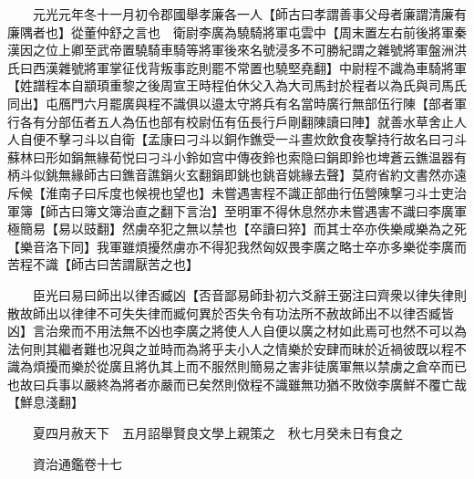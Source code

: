 　　元光元年冬十一月初令郡國舉孝廉各一人【師古曰孝謂善事父母者廉謂清廉有廉隅者也】從董仲舒之言也　衛尉李廣為驍騎將軍屯雲中【周末置左右前後將軍秦漢因之位上卿至武帝置驍騎車騎等將軍後來名號浸多不可勝紀謂之雜號將軍盤洲洪氏曰西漢雜號將軍掌征伐背叛事訖則罷不常置也驍堅堯翻】中尉程不識為車騎將軍【姓譜程本自顓頊重黎之後周宣王時程伯休父入為大司馬封於程者以為氏與司馬氏同出】屯鴈門六月罷廣與程不識俱以邉太守將兵有名當時廣行無部伍行陳【部者軍行各有分部伍者五人為伍也部有校尉伍有伍長行戶剛翻陳讀曰陣】就善水草舍止人人自便不擊刁斗以自衛【孟康曰刁斗以銅作鐎受一斗晝炊飲食夜撃持行故名曰刁斗蘇林曰形如鋗無緣荀悦曰刁斗小鈴如宫中傳夜鈴也索隐曰鋗即鈴也埤蒼云鐎温器有柄斗似銚無緣師古曰鐎音譙鋗火玄翻鋗即銚也銚音姚緣去聲】莫府省約文書然亦遠斥候【淮南子曰斥度也候視也望也】未嘗遇害程不識正部曲行伍營陳撃刁斗士吏治軍簿【師古曰簿文簿治直之翻下言治】至明軍不得休息然亦未嘗遇害不識曰李廣軍極簡易【易以豉翻】然虜卒犯之無以禁也【卒讀曰猝】而其士卒亦佚樂咸樂為之死【樂音洛下同】我軍雖煩擾然虜亦不得犯我然匈奴畏李廣之略士卒亦多樂從李廣而苦程不識【師古曰苦謂厭苦之也】

　　臣光曰易曰師出以律否臧凶【否音鄙易師卦初六爻辭王弼注曰齊衆以律失律則散故師出以律律不可失失律而臧何異於否失令有功法所不赦故師出不以律否臧皆凶】言治衆而不用法無不凶也李廣之將使人人自便以廣之材如此焉可也然不可以為法何則其繼者難也况與之並時而為將乎夫小人之情樂於安肆而昧於近禍彼既以程不識為煩擾而樂於從廣且將仇其上而不服然則簡易之害非徒廣軍無以禁虜之倉卒而已也故曰兵事以嚴終為將者亦嚴而已矣然則傚程不識雖無功猶不敗傚李廣鮮不覆亡哉【鮮息淺翻】

　　夏四月赦天下　五月詔舉賢良文學上親策之　秋七月癸未日有食之

　　資治通鑑卷十七  
    


 


 



 

 
  







 


　　
　　
　
　
　


　　

　















